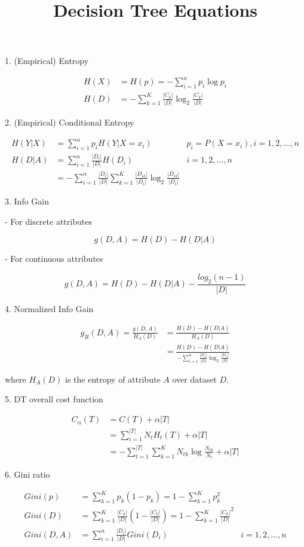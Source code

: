 \documentclass[12pt]{article}
\title{Decision Tree Equations}
\begin{document}
\maketitle

1. (Empirical) Entropy

\begin{align*}
  H(X) &= H(p) = -\sum_{i=1}^{n} p_i \log p_i \\
  H(D) &= -\sum_{k=1}^K \frac{|C_k|}{|D|} \log_2\frac{|C_k|}{|D|}
\end{align*}

2. (Empirical) Conditional Entropy


\begin{align*}
  H(Y|X)&=\sum_{i=1}^n p_i H(Y|X=x_i)  & p_i=P(X=x_i),i=1,2,\dots ,n \\
  H(D|A)&=\sum_{i=1}^n \frac{|D_i|}{|D|} H(D_i)  & i=1,2,\dots ,n \\
        &=-\sum_{i=1}^n \frac{|D_i|}{|D|} \sum_{k=1}^K \frac{|D_{ik}|}{|D_i|} \log_2\frac{|D_{ik}|}{|D_i|}
\end{align*}

3. Info Gain

- For discrete attributes

$$ g(D,A) = H(D) - H(D|A) $$

- For continuous attributes

$$ g(D,A) = H(D) - H(D|A) - \frac {log_2{(n-1)}} {|D|} $$

4. Normalized Info Gain

\begin{align*}
  g_R(D,A) = \frac {g(D, A)} {H_A(D)} &= \frac {H(D) - H(D|A)} {H_A(D)} \\
  &= \frac {H(D) - H(D|A)} { -\sum_{i=1}^n \frac{|D_i|}{|D|} \log_2\frac{|D_i|}{|D|} } 
\end{align*}

where $H_A(D)$ is the entropy of attribute $A$ over dataset $D$.

5. DT overall cost function


\begin{align*}
  C_\alpha(T) &= C(T) + \alpha|T| \\
    &=\sum_{i=1}^{|T|}N_tH_t(T)+\alpha|T| \\
    &=-\sum_{t=1}^{|T|}\sum_{k=1}^K N_{tk} \log\frac{N_{tk}}{N_t} + \alpha|T|
\end{align*}


6. Gini ratio

\begin{align*}
  Gini(p) &= \sum_{k=1}^K p_k(1-p_k) = 1 - \sum_{k=1}^K p_k^2 \\
  Gini(D) &= \sum_{k=1}^K  \frac{|C_k|}{|D|} (1 - \frac{|C_k|}{|D|}) = 1 - \sum_{k=1}^K \frac{|C_k|}{|D|}^2 \\
  Gini(D, A) &= \sum_{i=1}^n \frac{|D_i|}{|D|} Gini(D_i)  & i=1,2,\dots ,n
\end{align*}
\end{document}

